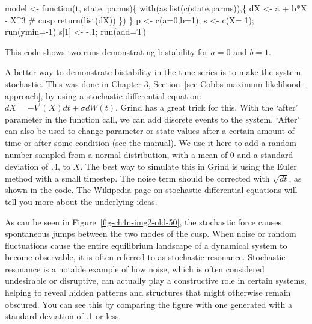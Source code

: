 \documentclass[
  a4paper,
  DIV=11,
  numbers=noendperiod,
  oneside]{scrreprt}
\newenvironment{Shaded}{\begin{snugshade}}{\end{snugshade}}
\newcommand{\AttributeTok}[1]{\textcolor[rgb]{0.40,0.45,0.13}{#1}}
\newcommand{\CommentTok}[1]{\textcolor[rgb]{0.37,0.37,0.37}{#1}}
\newcommand{\ControlFlowTok}[1]{\textcolor[rgb]{0.00,0.23,0.31}{#1}}
\newcommand{\DecValTok}[1]{\textcolor[rgb]{0.68,0.00,0.00}{#1}}
\newcommand{\FunctionTok}[1]{\textcolor[rgb]{0.28,0.35,0.67}{#1}}
\newcommand{\NormalTok}[1]{\textcolor[rgb]{0.00,0.23,0.31}{#1}}
\newcommand{\OtherTok}[1]{\textcolor[rgb]{0.00,0.23,0.31}{#1}}
\newcommand{\SpecialCharTok}[1]{\textcolor[rgb]{0.37,0.37,0.37}{#1}}
\begin{document}
\begin{Shaded}
\begin{Highlighting}[]
\NormalTok{model }\OtherTok{\textless{}{-}} \ControlFlowTok{function}\NormalTok{(t, state, parms)\{}
  \FunctionTok{with}\NormalTok{(}\FunctionTok{as.list}\NormalTok{(}\FunctionTok{c}\NormalTok{(state,parms)),\{}
\NormalTok{    dX }\OtherTok{\textless{}{-}}\NormalTok{  a }\SpecialCharTok{+}\NormalTok{ b}\SpecialCharTok{*}\NormalTok{X }\SpecialCharTok{{-}}\NormalTok{ X}\SpecialCharTok{\^{}}\DecValTok{3}        \CommentTok{\# cusp}
    \FunctionTok{return}\NormalTok{(}\FunctionTok{list}\NormalTok{(dX))}
\NormalTok{  \})}
\NormalTok{\}}
\NormalTok{p }\OtherTok{\textless{}{-}} \FunctionTok{c}\NormalTok{(}\AttributeTok{a=}\DecValTok{0}\NormalTok{,}\AttributeTok{b=}\DecValTok{1}\NormalTok{); s }\OtherTok{\textless{}{-}} \FunctionTok{c}\NormalTok{(}\AttributeTok{X=}\NormalTok{.}\DecValTok{1}\NormalTok{); }\FunctionTok{run}\NormalTok{(}\AttributeTok{ymin=}\SpecialCharTok{{-}}\DecValTok{1}\NormalTok{)}
\NormalTok{s[}\DecValTok{1}\NormalTok{] }\OtherTok{\textless{}{-}} \SpecialCharTok{{-}}\NormalTok{.}\DecValTok{1}\NormalTok{; }\FunctionTok{run}\NormalTok{(}\AttributeTok{add=}\NormalTok{T)}
\end{Highlighting}
\end{Shaded}

This code shows two runs demonstrating bistability for \(a = 0\) and
\(b = 1\).

A better way to demonstrate bistability in the time series is to make
the system stochastic. This was done in Chapter 3,
Section~\ref{sec-Cobbs-maximum-likelihood-approach}, by using a
stochastic differential equation: \(dX = - V^{'}(X)dt + \sigma dW(t)\).
Grind has a great trick for this. With the `after' parameter in the
function call, we can add discrete events to the system. `After' can
also be used to change parameter or state values after a certain amount
of time or after some condition (see the manual). We use it here to add
a random number sampled from a normal distribution, with a mean of 0 and
a standard deviation of .4, to \(X\). The best way to simulate this in
Grind is using the Euler method with a small timestep. The noise term
should be corrected with \(\sqrt{dt}\), as shown in the code. The
Wikipedia page on stochastic differential equations will tell you more
about the underlying ideas.

As can be seen in Figure~\ref{fig-ch4n-img2-old-50}, the stochastic
force causes spontaneous jumps between the two modes of the cusp. When
noise or random fluctuations cause the entire equilibrium landscape of a
dynamical system to become observable, it is often referred to as
stochastic resonance. Stochastic resonance is a notable example of how
noise, which is often considered undesirable or disruptive, can actually
play a constructive role in certain systems, helping to reveal hidden
patterns and structures that might otherwise remain obscured. You can
see this by comparing the figure with one generated with a standard
deviation of .1 or less.
\end{document}
